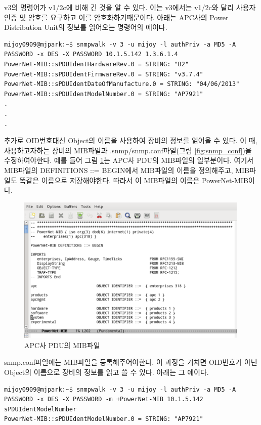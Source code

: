 \documentclass[11pt
  , a4paper
  , article
  , oneside
]{memoir}
\begin{document}
v3의 명령어가 v1/2c에 비해 긴 것을 알 수 있다. 이는 v3에서는 v1/2c와 달리 사용자인증 및 암호를 요구하고 이를 암호화하기때문이다. 아래는 APC사의 Power Distribution Unit의 정보를 읽어오는 명령어의 예이다.

\begin{lstlisting}[style=termstyle]
mijoy0909@mjpark:~$ snmpwalk -v 3 -u mijoy -l authPriv -a MD5 -A PASSWORD -x DES -X PASSWORD 10.1.5.142 1.3.6.1.4
PowerNet-MIB::sPDUIdentHardwareRev.0 = STRING: "B2"
PowerNet-MIB::sPDUIdentFirmwareRev.0 = STRING: "v3.7.4"
PowerNet-MIB::sPDUIdentDateOfManufacture.0 = STRING: "04/06/2013"
PowerNet-MIB::sPDUIdentModelNumber.0 = STRING: "AP7921"
.
.
.
\end{lstlisting}

추가로 OID번호대신 Object의 이름을 사용하여 장비의 정보를 읽어올 수 있다. 이 때, 사용하고자하는 장비의 MIB파일과  .snmp/snmp.conf파일(그림 \ref{fig:snmp_conf})을 수정하여야한다.
예를 들어 그림 \ref{fig:pdu_mib}는 APC사 PDU의 MIB파일의 일부분이다. 여기서 MIB파일의 DEFINITIONS ::= BEGIN에서 MIB파일의 이름을 정의해주고, MIB파일도 똑같은 이름으로 저장해야한다. 따라서 이 MIB파일의 이름은 PowerNet-MIB이다. 

\begin{figure}[h]
  \centering
  \includegraphics[width=0.99\textwidth]{./images/pdu_mib.eps}
  \caption{APC사 PDU의 MIB파일}
  \label{fig:pdu_mib}   
\end{figure}


\clearpage

snmp.conf파일에는 MIB파일을 등록해주어야한다. 이 과정을 거치면 OID번호가 아닌 Object의 이름으로 장비의 정보를 읽고 쓸 수 있다. 아래는 그 예이다.

\begin{lstlisting}[style=termstyle]
mijoy0909@mjpark:~$ snmpwalk -v 3 -u mijoy -l authPriv -a MD5 -A PASSWORD -x DES -X PASSWORD -m +PowerNet-MIB 10.1.5.142 sPDUIdentModelNumber
PowerNet-MIB::sPDUIdentModelNumber.0 = STRING: "AP7921"
\end{lstlisting}
\end{document}

